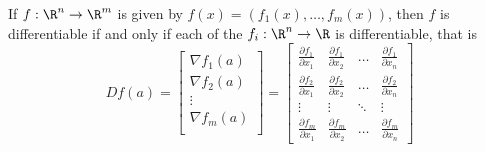 \documentclass[11pt]{article}
\begin{document}
\begin{proposition*}
  \label{the jacobian matrix}
  If $f:\R^n \to \R^m$ is given by $f(x) = (f_1(x), \dots, f_m(x))$, then $f$ is differentiable if and only if each of the $f_i:\R^n\to \R$ is differentiable, that is
  \[
    Df(a) =
      \begin{bmatrix}
        \nabla f_1(a)\\
        \nabla f_2(a)\\
        \vdots\\
        \nabla f_m(a)\\
      \end{bmatrix}
      =
      \begin{bmatrix}
        \frac{\partial f_1}{\partial x_1} & \frac{\partial f_1}{\partial x_2} & \dots  & \frac{\partial f_1}{\partial x_n} \\
        \frac{\partial f_2}{\partial x_1} & \frac{\partial f_2}{\partial x_2} & \dots  & \frac{\partial f_2}{\partial x_n} \\
        \vdots & \vdots & \ddots & \vdots \\
        \frac{\partial f_m}{\partial x_1} & \frac{\partial f_m}{\partial x_2} & \dots  & \frac{\partial f_m}{\partial x_n}
      \end{bmatrix}
  \]
\end{proposition*}
\end{document}
